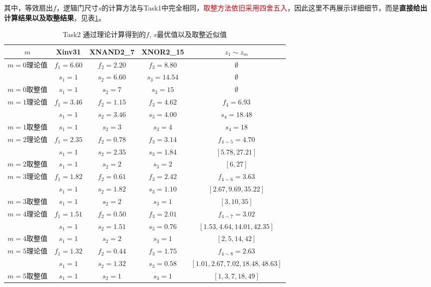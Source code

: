 \documentclass[UTF8,12pt,a4paper]{ctexart}
\begin{document}
其中，等效扇出$f$，逻辑门尺寸$s$的计算方法与Task1中完全相同，\textcolor{red}{取整方法依旧采用四舍五入}，因此这里不再展示详细细节，而是\textbf{直接给出计算结果以及取整结果}，见表\ref{tab:task2_theo_best_sf}。
\begin{table}[htbp]
    \centering
    \caption{Task2 通过理论计算得到的$f$, $s$最优值以及取整近似值}
    \label{tab:task2_theo_best_sf}
    \small
    \begin{tabular}{ccccc}
    \toprule
    $m$ & Xinv31 & XNAND2\_7 & XNOR2\_15 & $z_1 \sim z_m$ \\
    \midrule
    \multirow{2}{*}{$m=0$理论值} & $f_1 = 6.60$ & $f_2 = 2.20$ & $f_3 = 8.80$ & $\emptyset$ \\
                                 & $s_1 = 1$ & $s_2 = 6.60$ & $s_3 = 14.54$ & $\emptyset$ \\
    $m=0$取整值 & $s_1 = 1$ & $s_2 = 7$ & $s_3 = 15$ & $\emptyset$ \\
    \midrule
    \multirow{2}{*}{$m=1$理论值} & $f_1 = 3.46$ & $f_2 = 1.15$ & $f_3 = 4.62$ & $f_4 = 6.93$ \\
                                 & $s_1 = 1$ & $s_2 = 3.46$ & $s_3 = 4.00$ & $s_4 = 18.48$ \\
    $m=1$取整值 & $s_1 = 1$ & $s_2 = 3$ & $s_3 = 4$ & $s_4 = 18$ \\
    \midrule
    \multirow{2}{*}{$m=2$理论值} & $f_1 = 2.35$ & $f_2 = 0.78$ & $f_3 = 3.14$ & $f_{4\sim5} = 4.70$ \\
                                 & $s_1 = 1$ & $s_2 = 2.35$ & $s_3 = 1.84$ & $[5.78, 27.21]$ \\
    $m=2$取整值 & $s_1 = 1$ & $s_2 = 2$ & $s_3 = 2$ & $[6, 27]$ \\
    \midrule
    \multirow{2}{*}{$m=3$理论值} & $f_1 = 1.82$ & $f_2 = 0.61$ & $f_3 = 2.42$ & $f_{4\sim6} = 3.63$ \\
                                 & $s_1 = 1$ & $s_2 = 1.82$ & $s_3 = 1.10$ & $[2.67, 9.69, 35.22]$ \\
    $m=3$取整值 & $s_1 = 1$ & $s_2 = 2$ & $s_3 = 1$ & $[3, 10, 35]$ \\
    \midrule
    \multirow{2}{*}{$m=4$理论值} & $f_1 = 1.51$ & $f_2 = 0.50$ & $f_3 = 2.01$ & $f_{4\sim7} = 3.02$ \\
                                 & $s_1 = 1$ & $s_2 = 1.51$ & $s_3 = 0.76$ & $[1.53, 4.64, 14.01, 42.35]$ \\
    $m=4$取整值 & $s_1 = 1$ & $s_2 = 2$ & $s_3 = 1$ & $[2, 5, 14, 42]$ \\
    \midrule
    \multirow{2}{*}{$m=5$理论值} & $f_1 = 1.32$ & $f_2 = 0.44$ & $f_3 = 1.75$ & $f_{4\sim8} = 2.63$ \\
                                 & $s_1 = 1$ & $s_2 = 1.32$ & $s_3 = 0.58$ & $[1.01, 2.67, 7.02, 18.48, 48.63]$ \\
    $m=5$取整值 & $s_1 = 1$ & $s_2 = 1$ & $s_3 = 1$ & $[1, 3, 7, 18, 49]$ \\
    \bottomrule
    \end{tabular}
\end{table}
\end{document}
